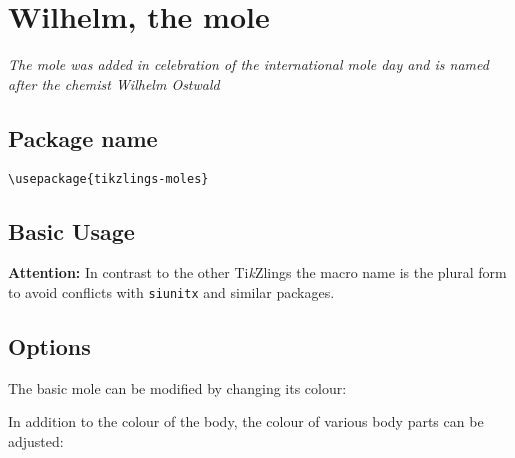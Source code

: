 \documentclass[parskip=half]{scrartcl}
\newcommand{\tikzlings}{Ti\emph{k}Zlings\xspace}
\begin{document}
%
%
\clearpage
\section[Mole]{Wilhelm, the mole}

\emph{The mole was added in celebration of the international mole day and is named after the chemist Wilhelm Ostwald}

\subsection{Package name}

\begin{tcolorbox}[lower separated=false, lefthand width=.8\linewidth]
\vspace*{0.5cm}
\lstinline|\usepackage{tikzlings-moles}| 
\vspace*{0.5cm}
\end{tcolorbox}

\subsection{Basic Usage}

\textcolor{red!60!black}{\textbf{Attention:} In contrast to the other \tikzlings the macro name is the plural form to avoid conflicts with  \lstinline|siunitx| and similar packages.}
\begin{tcblisting}{}
\moles
\end{tcblisting}

\subsection{Options}

The basic mole can be modified by changing its colour:
\begin{tcblisting}{}
\moles[body=blue]
\end{tcblisting}

In addition to the colour of the body, the colour of various body parts can be adjusted:
\begin{tcblisting}{}
\moles[eye=red]
\end{tcblisting}

\begin{tcblisting}{}
\moles[muzzle=red]
\end{tcblisting}
\end{document}
